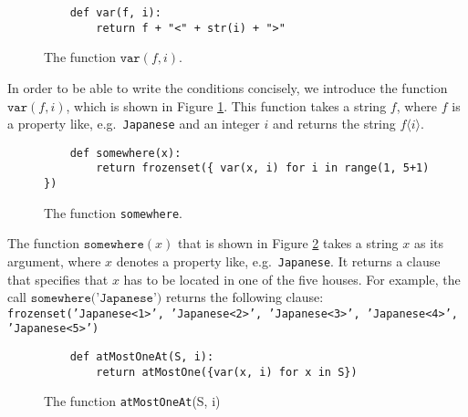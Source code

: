 \begin{figure}[!ht]
\centering
\begin{verbatim}
    def var(f, i):
        return f + "<" + str(i) + ">" 
\end{verbatim}
\vspace*{-0.3cm}
\caption{The function $\texttt{var}(f, i)$.}
\label{fig:var_f_i}
\end{figure}

In order to be able to write the conditions concisely, we introduce the function
$\texttt{var}(f, i)$, which is shown in Figure \ref{fig:var_f_i}.  This function
takes a string $f$, where $f$ is a property like, e.g.~\texttt{Japanese} and an
integer $i$ and returns the string $f\langle i\rangle$.




\begin{figure}[!ht]
\centering
\begin{verbatim}
    def somewhere(x):
        return frozenset({ var(x, i) for i in range(1, 5+1) })
\end{verbatim}
\vspace*{-0.3cm}
\caption{The function \texttt{somewhere}.}
\label{fig:somewhere}
\end{figure}
The function $\texttt{somewhere}(x)$ that is shown in Figure \ref{fig:somewhere}
takes a string $x$ as its argument, where $x$ denotes a property like,
e.g.~\texttt{Japanese}.  It returns a clause that specifies that $x$ has to be
located in one of the five houses.  For example,  the call
$\texttt{somewhere('Japanese')}$ returns the following clause:
\\[0.2cm]
\hspace*{0.3cm}
\texttt{frozenset({'Japanese<1>', 'Japanese<2>', 'Japanese<3>', 'Japanese<4>', 'Japanese<5>'})}

\pagebreak
\begin{figure}[!ht]
\centering
\begin{verbatim}
    def atMostOneAt(S, i):
        return atMostOne({var(x, i) for x in S})
\end{verbatim}
\vspace*{-0.3cm}
\caption{The function \texttt{atMostOneAt}(S, i)}
\label{fig:atMostOneAt}
\end{figure}

